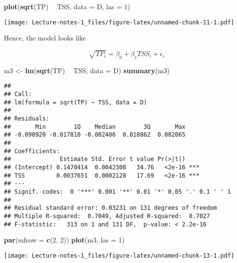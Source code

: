 \documentclass[
]{book}
\newenvironment{Shaded}{\begin{snugshade}}{\end{snugshade}}
\newcommand{\DataTypeTok}[1]{\textcolor[rgb]{0.13,0.29,0.53}{#1}}
\newcommand{\DecValTok}[1]{\textcolor[rgb]{0.00,0.00,0.81}{#1}}
\newcommand{\KeywordTok}[1]{\textcolor[rgb]{0.13,0.29,0.53}{\textbf{#1}}}
\newcommand{\NormalTok}[1]{#1}
\newcommand{\OperatorTok}[1]{\textcolor[rgb]{0.81,0.36,0.00}{\textbf{#1}}}
\newcommand{\StringTok}[1]{\textcolor[rgb]{0.31,0.60,0.02}{#1}}
\begin{document}
\begin{Shaded}
\begin{Highlighting}[]
\KeywordTok{plot}\NormalTok{(}\KeywordTok{sqrt}\NormalTok{(TP) }\OperatorTok{~}\StringTok{ }\NormalTok{TSS, }\DataTypeTok{data =}\NormalTok{ D, }\DataTypeTok{las =} \DecValTok{1}\NormalTok{)}
\end{Highlighting}
\end{Shaded}

\texttt{[image: Lecture-notes-1\_files/figure-latex/unnamed-chunk-11-1.pdf]}

Hence, the model looks like

\[\sqrt{TP_i} = \beta_0 + \beta_1 TSS_i + \epsilon_i\]

\begin{Shaded}
\begin{Highlighting}[]
\NormalTok{m3 <-}\StringTok{ }\KeywordTok{lm}\NormalTok{(}\KeywordTok{sqrt}\NormalTok{(TP) }\OperatorTok{~}\StringTok{ }\NormalTok{TSS, }\DataTypeTok{data =}\NormalTok{ D)}
\KeywordTok{summary}\NormalTok{(m3)}
\end{Highlighting}
\end{Shaded}

\begin{verbatim}
## 
## Call:
## lm(formula = sqrt(TP) ~ TSS, data = D)
## 
## Residuals:
##       Min        1Q    Median        3Q       Max 
## -0.090920 -0.017810 -0.002486  0.018862  0.082065 
## 
## Coefficients:
##              Estimate Std. Error t value Pr(>|t|)    
## (Intercept) 0.1470414  0.0042308   34.76   <2e-16 ***
## TSS         0.0037651  0.0002128   17.69   <2e-16 ***
## ---
## Signif. codes:  0 '***' 0.001 '**' 0.01 '*' 0.05 '.' 0.1 ' ' 1
## 
## Residual standard error: 0.03231 on 131 degrees of freedom
## Multiple R-squared:  0.7049, Adjusted R-squared:  0.7027 
## F-statistic:   313 on 1 and 131 DF,  p-value: < 2.2e-16
\end{verbatim}

\begin{Shaded}
\begin{Highlighting}[]
\KeywordTok{par}\NormalTok{(}\DataTypeTok{mfrow =} \KeywordTok{c}\NormalTok{(}\DecValTok{2}\NormalTok{, }\DecValTok{2}\NormalTok{))}
\KeywordTok{plot}\NormalTok{(m3, }\DataTypeTok{las =} \DecValTok{1}\NormalTok{)}
\end{Highlighting}
\end{Shaded}

\texttt{[image: Lecture-notes-1\_files/figure-latex/unnamed-chunk-13-1.pdf]}
\end{document}
